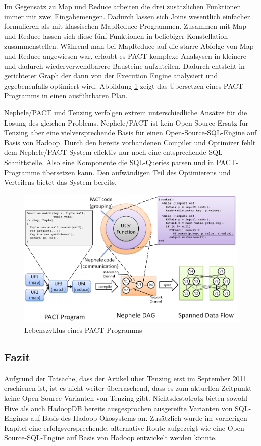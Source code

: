 \documentclass[a4paper]{article}
\begin{document}
Im Gegensatz zu Map und Reduce arbeiten die drei zusätzlichen Funktionen immer mit zwei Eingabemengen. Dadurch lassen sich Joins wesentlich einfacher formulieren als mit klassischen MapReduce-Programmen. Zusammen mit Map und Reduce lassen sich diese fünf Funktionen in beliebiger Konstellation zusammenstellen. Während man bei MapReduce auf die starre Abfolge von Map und Reduce angewiesen war, erlaubt es PACT komplexe Analsysen in kleinere und dadurch wiederverwendbarere Bausteine aufzuteilen. Dadurch entsteht in gerichteter Graph der dann von der Execution Engine analysiert und gegebenenfalls optimiert wird. Abbildung \ref{fig:pact} zeigt das Übersetzen eines PACT-Programms in einen ausführbaren Plan.

Nephele/PACT und Tenzing verfolgen extrem unterschiedliche Ansätze für die Lösung des gleichen Problems. Nephele/PACT ist kein Open-Source-Ersatz für Tenzing aber eine vielversprechende Basis für einen Open-Source-SQL-Engine auf Basis von Hadoop. Durch den bereits vorhandenen Compiler und Optimizer fehlt dem Nephele/PACT-System effektiv nur noch eine entsprechende SQL-Schnittstelle. Also eine Komponente die SQL-Queries parsen und in PACT-Programme übersetzen kann. Den aufwändigen Teil des Optimierens und Verteilens bietet das System bereits. 

\begin{figure}[H]
\centering
\includegraphics[width=\textwidth]{compilation.png}
\caption{Lebenszyklus eines PACT-Programms}
\label{fig:pact}
\end{figure}

\subsection{Fazit}
Aufgrund der Tatsache, dass der Artikel über Tenzing erst im September 2011 erschienen ist, ist es nicht weiter überraschend, dass es zum aktuellen Zeitpunkt keine Open-Source-Varianten von Tenzing gibt. Nichtsdestotrotz bieten sowohl Hive als auch HadoopDB bereits ausgesprochen ausgereifte Varianten von SQL-Engines auf Basis des Hadoop-Ökosystems an. Zusätzlich wurde im vorherigen Kapitel eine erfolgsversprechende, alternative Route aufgezeigt wie eine Open-Source-SQL-Engine auf Basis von Hadoop entwickelt werden könnte.
\end{document}
